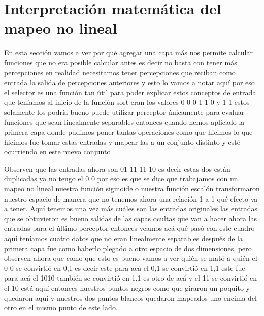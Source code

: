 \section{Interpretación matemática del mapeo no lineal}
En esta sección vamos a ver por qué agregar una capa más nos permite calcular funciones que no era posible calcular antes es decir no basta con tener más percepciones en realidad necesitamos tener percepciones que reciban como entrada la salida de percepciones anteriores y esto lo vamos a notar aquí por eso el selector es una función tan útil para poder explicar estos conceptos de entrada que teníamos al inicio de la función sort eran los valores 0 0 0 1 1 0 y 1 1 estos solamente los podría bueno puede utilizar perceptor únicamente para evaluar funciones que sean linealmente separables entonces cuando hemos aplicado la primera capa donde pudimos poner tantas operaciones como que hicimos lo que hicimos fue tomar estas entradas y mapear las a un conjunto distinto y esté ocurriendo en este nuevo conjunto 

Observen que las entradas ahora son 01 11 11 10 es decir estas dos están duplicadas ya no tengo el 0 0 por eso es que se dice que trabajamos con un mapeo no lineal nuestra función sigmoide o nuestra función escalón transformaron nuestro espacio de manera que no tenemos ahora una relación 1 a 1 qué efecto va a tener. Aquí tenemos una vez más cuáles son las entradas originales las entradas que se obtuvieron es bueno salidas de las capas ocultas que van a hacer ahora las entradas para el último perceptor entonces veamos acá qué pasó con este cuadro aquí teníamos cuatro datos que no eran linealmente separables después de la primera capa fue como haberlo plegado a otro espacio de dos dimensiones, pero observen ahora que como que esto es bueno vamos a ver quién se mató a quién el 0 0 se convirtió en 0,1 es decir este para acá el 0,1 se convirtió en 1,1 este fue para acá el 1010 también se convirtió en 1,1 es otro de acá y el 11 se convirtió en el 10 está aquí entonces nuestros puntos negros como que giraron un poquito y quedaron aquí y nuestros dos puntos blancos quedaron mapeados uno encima del otro en el mismo punto de este lado. 

